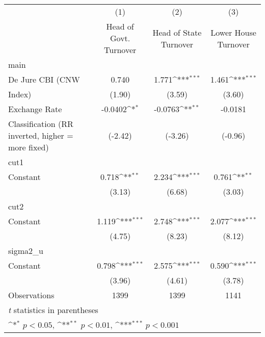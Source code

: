 {
\def\sym#1{\ifmmode^{#1}\else\(^{#1}\)\fi}
\begin{tabular}{l*{3}{c}}
\hline\hline
                    &\multicolumn{1}{c}{(1)}&\multicolumn{1}{c}{(2)}&\multicolumn{1}{c}{(3)}\\
                    &\multicolumn{1}{c}{Head of Govt. Turnover}&\multicolumn{1}{c}{Head of State Turnover}&\multicolumn{1}{c}{Lower House Turnover}\\
\hline
main                &                     &                     &                     \\
De Jure CBI (CNW    &       0.740         &       1.771\sym{***}&       1.461\sym{***}\\
Index)              &      (1.90)         &      (3.59)         &      (3.60)         \\
[1em]
Exchange Rate       &     -0.0402\sym{*}  &     -0.0763\sym{**} &     -0.0181         \\
Classification (RR inverted, higher = more fixed)&     (-2.42)         &     (-3.26)         &     (-0.96)         \\
\hline
cut1                &                     &                     &                     \\
Constant            &       0.718\sym{**} &       2.234\sym{***}&       0.761\sym{**} \\
                    &      (3.13)         &      (6.68)         &      (3.03)         \\
\hline
cut2                &                     &                     &                     \\
Constant            &       1.119\sym{***}&       2.748\sym{***}&       2.077\sym{***}\\
                    &      (4.75)         &      (8.23)         &      (8.12)         \\
\hline
sigma2\_u            &                     &                     &                     \\
Constant            &       0.798\sym{***}&       2.575\sym{***}&       0.590\sym{***}\\
                    &      (3.96)         &      (4.61)         &      (3.78)         \\
\hline
Observations        &        1399         &        1399         &        1141         \\
\hline\hline
\multicolumn{4}{l}{\footnotesize \textit{t} statistics in parentheses}\\
\multicolumn{4}{l}{\footnotesize \sym{*} \(p<0.05\), \sym{**} \(p<0.01\), \sym{***} \(p<0.001\)}\\
\end{tabular}
}
